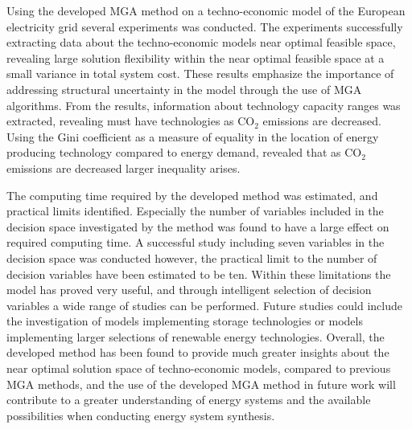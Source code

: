 Using the developed MGA method on a techno-economic model of the European electricity grid several experiments was conducted. The experiments successfully extracting data about the techno-economic models near optimal feasible space, revealing large solution flexibility within the near optimal feasible space at a small variance in total system cost. These results emphasize the importance of addressing structural uncertainty in the model through the use of MGA algorithms. From the results, information about technology capacity ranges was extracted, revealing must have technologies as $\text{CO}_2$ emissions are decreased. Using the Gini coefficient as a measure of equality in the location of energy producing technology compared to energy demand, revealed that as $\text{CO}_2$ emissions are decreased larger inequality arises. 

The computing time required by the developed method was estimated, and practical limits identified. Especially the number of variables included in the decision space investigated by the method was found to have a large effect on required computing time. A successful study including seven variables in the decision space was conducted however, the practical limit to the number of decision variables have been estimated to be ten. Within these limitations the model has proved very useful, and through intelligent selection of decision variables a wide range of studies can be performed. 
Future studies could include the investigation of models implementing storage technologies or models implementing larger selections of renewable energy technologies. 
Overall, the developed method has been found to provide much greater insights about the near optimal solution space of techno-economic models, compared to previous MGA methods, and the use of the developed MGA method in future work will contribute to a greater understanding of energy systems and the available possibilities when conducting energy system synthesis.




